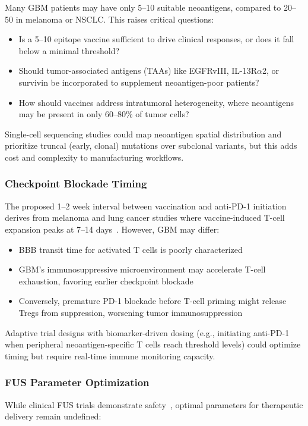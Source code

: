 \documentclass[12pt]{article}
\begin{document}
Many GBM patients may have only 5--10 suitable neoantigens, compared to 20--50 in melanoma or NSCLC. This raises critical questions:

\begin{itemize}[leftmargin=*,noitemsep]
\item Is a 5--10 epitope vaccine sufficient to drive clinical responses, or does it fall below a minimal threshold?
\item Should tumor-associated antigens (TAAs) like EGFRvIII, IL-13R$\alpha$2, or survivin be incorporated to supplement neoantigen-poor patients?
\item How should vaccines address intratumoral heterogeneity, where neoantigens may be present in only 60--80\% of tumor cells?
\end{itemize}

Single-cell sequencing studies could map neoantigen spatial distribution and prioritize truncal (early, clonal) mutations over subclonal variants, but this adds cost and complexity to manufacturing workflows.

\subsubsection{Checkpoint Blockade Timing}
The proposed 1--2 week interval between vaccination and anti-PD-1 initiation derives from melanoma and lung cancer studies where vaccine-induced T-cell expansion peaks at 7--14 days~\citep{chen2024}. However, GBM may differ:

\begin{itemize}[leftmargin=*,noitemsep]
\item BBB transit time for activated T cells is poorly characterized
\item GBM's immunosuppressive microenvironment may accelerate T-cell exhaustion, favoring earlier checkpoint blockade
\item Conversely, premature PD-1 blockade before T-cell priming might release Tregs from suppression, worsening tumor immunosuppression
\end{itemize}

Adaptive trial designs with biomarker-driven dosing (e.g., initiating anti-PD-1 when peripheral neoantigen-specific T cells reach threshold levels) could optimize timing but require real-time immune monitoring capacity.

\subsubsection{FUS Parameter Optimization}
While clinical FUS trials demonstrate safety~\citep{chen2024fus}, optimal parameters for therapeutic delivery remain undefined:
\end{document}
